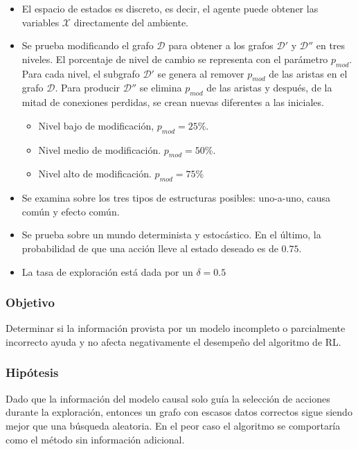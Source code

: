 \begin{itemize}
    \item El espacio de estados es discreto, es decir, el agente puede
    obtener las variables $\mathcal{X}$ directamente del ambiente.
    \item Se prueba modificando el grafo $\mathcal{D}$ para obtener a los
    grafos $\mathcal{D'}$ y $\mathcal{D''}$ en tres niveles. El porcentaje de nivel de cambio se representa con el parámetro $p_{mod}$.
    Para cada nivel, el subgrafo $\mathcal{D'}$ se genera al remover $p_{mod}$ de las aristas en el grafo $\mathcal{D}$. Para producir $\mathcal{D''}$ se elimina $p_{mod}$ de las aristas y después, de la mitad de conexiones perdidas, se crean nuevas diferentes a las iniciales.
    \begin{itemize}
        \item Nivel bajo de modificación, $p_{mod} = 25 \%$.
        \item Nivel medio de modificación. $p_{mod} = 50 \%$.
        \item Nivel alto de modificación. $p_{mod} = 75 \%$
    \end{itemize}
    \item Se examina sobre los tres tipos de estructuras posibles: uno-a-uno, 
    causa común y efecto común. 
    \item Se prueba sobre un mundo determinista y estocástico. En el último,
    la probabilidad de que una acción lleve al estado deseado es de $0.75$.
    
    \item La tasa de exploración está dada por un $\delta = 0.5$
\end{itemize}

\subsubsection{Objetivo}

Determinar si la información provista por un modelo
incompleto o parcialmente incorrecto ayuda y no
afecta negativamente el desempeño del algoritmo de RL.

\subsubsection{Hipótesis}

Dado que la información del modelo causal solo guía la selección
de acciones durante la exploración, entonces un grafo con escasos
datos correctos sigue siendo mejor que una búsqueda aleatoria. En el
peor caso el algoritmo se comportaría como el método sin información adicional.


